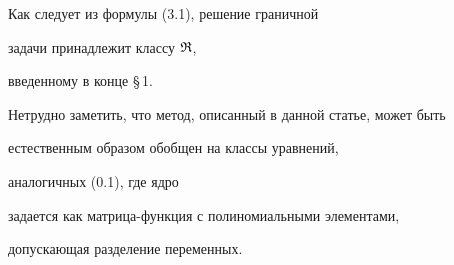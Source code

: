  


Как следует из формулы (3.1), решение граничной 


задачи принадлежит классу $\frak R$, 


введенному в конце \S\,1. 


 


\begin{notenonum} 


Нетрудно заметить, что метод, описанный в данной статье, может быть 


естественным образом обобщен на классы уравнений, 


аналогичных (0.1), где ядро 


задается как матрица-функция с полиномиальными элементами, 


допускающая разделение переменных. 


\end{notenonum} 


 


 


